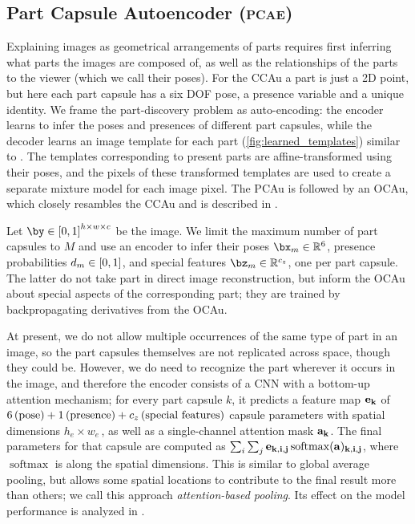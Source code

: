 \subsection{Part Capsule Autoencoder (\textsc{pcae})}
\label{sec:img_capsule}
Explaining images as geometrical arrangements of parts requires first inferring what parts the images are composed of, as well as the relationships of the parts to the viewer (which we call their poses). For the \gls{CCAu} a part is just a 2D point, but here each part capsule has a six \gls{DOF} pose, a presence variable and a unique identity. We frame the part-discovery problem as auto-encoding: the encoder learns to infer the poses and presences of different part capsules, while the decoder learns an image template for each part (\cref{fig:learned_templates}) similar to \cite{Tieleman2014thesis,Eslami2016air}. The templates corresponding to present parts are affine-transformed using their poses, and the pixels of these transformed templates are used to create a separate mixture model for each image pixel.
The \gls{PCAu} is followed by an \gls{OCAu}, which closely resambles the \gls{CCAu} and is described in .

Let $\by \in \interval{0, 1}^{h \times w \times c}$ be the image.
We limit the maximum number of part capsules to $M$ and use an encoder to infer their poses $\bx_m \in \RR^6$, presence probabilities $d_m \in {\left[0, 1\right]}$, and special features $\bz_m \in \RR^{c_z}$, one per part capsule.
The latter do not take part in direct image reconstruction, but inform the \gls{OCAu} about special aspects of the corresponding part; they are trained by backpropagating derivatives from the \gls{OCAu}.

At present, we do not allow multiple occurrences of the same type of part in an image, so the part capsules themselves are not replicated across space, though they could be.
However, we do need to recognize the part wherever it occurs in the image, and therefore the encoder consists of a \gls{CNN} with a bottom-up attention mechanism; for every part capsule $k$, it predicts a feature map $\bf{e}_k$ of $6 \text{\,(pose)} + 1 \text{\,(presence)} + c_z \text{\,(special features)}$ capsule parameters with spatial dimensions $h_e \times w_e$\,, as well as a single-channel attention mask $\bf{a}_k$.
The final parameters for that capsule are computed as $\sum_{i} \sum_j \bf{e}_{k, i,j} \operatorname{softmax}(\bf{a})_{k,i,j}$, where $\operatorname{softmax}$ is along the spatial dimensions.
This is similar to global average pooling, but allows some spatial locations to contribute to the final result more than others; we call this approach \textit{attention-based pooling}. Its effect on the model performance is analyzed in .

